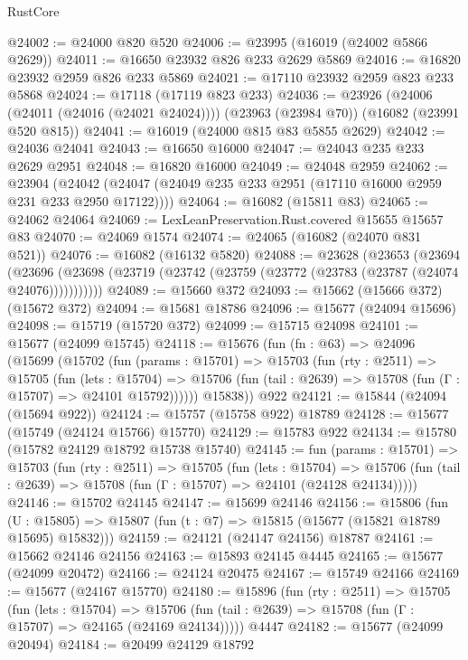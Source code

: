 \begin{lexlean}{RustCore}
\begin{coremodule}
@24002 := @24000 @820 @520
@24006 := @23995 (@16019 (@24002 @5866 @2629))
@24011 := @16650 @23932 @826 @233 @2629 @5869
@24016 := @16820 @23932 @2959 @826 @233 @5869
@24021 := @17110 @23932 @2959 @823 @233 @5868
@24024 := @17118 (@17119 @823 @233)
@24036 := @23926
    (@24006 (@24011 (@24016 (@24021 @24024))))
    (@23963 (@23984 @70))
    (@16082 (@23991 @520 @815))
@24041 := @16019 (@24000 @815 @83 @5855 @2629)
@24042 := @24036 @24041
@24043 := @16650 @16000
@24047 := @24043 @235 @233 @2629 @2951
@24048 := @16820 @16000
@24049 := @24048 @2959
@24062 := @23904
    (@24042 (@24047 (@24049 @235 @233 @2951 (@17110 @16000 @2959 @231 @233 @2950 @17122))))
@24064 := @16082 (@15811 @83)
@24065 := @24062 @24064
@24069 := LexLeanPreservation.Rust.covered @15655 @15657 @83
@24070 := @24069 @1574
@24074 := @24065 (@16082 (@24070 @831 @521))
@24076 := @16082 (@16132 @5820)
@24088 := @23628
    (@23653
      (@23694
        (@23696 (@23698 (@23719 (@23742 (@23759 (@23772 (@23783 (@23787 (@24074 @24076)))))))))))
@24089 := @15660 @372
@24093 := @15662 (@15666 @372) (@15672 @372)
@24094 := @15681 @18786
@24096 := @15677 (@24094 @15696)
@24098 := @15719 (@15720 @372)
@24099 := @15715 @24098
@24101 := @15677 (@24099 @15745)
@24118 := @15676
    (fun (fn : @63) =>
    @24096
      (@15699
        (@15702
          (fun (params : @15701) =>
          @15703
            (fun (rty : @2511) =>
            @15705
              (fun (lets : @15704) =>
              @15706 (fun (tail : @2639) => @15708 (fun (Γ : @15707) => @24101 @15792))))))
        @15838))
    @922
@24121 := @15844 (@24094 (@15694 @922))
@24124 := @15757 (@15758 @922) @18789
@24128 := @15677 (@15749 (@24124 @15766) @15770)
@24129 := @15783 @922
@24134 := @15780 (@15782 @24129 @18792 @15738 @15740)
@24145 := fun (params : @15701) =>
  @15703
    (fun (rty : @2511) =>
    @15705
      (fun (lets : @15704) =>
      @15706 (fun (tail : @2639) => @15708 (fun (Γ : @15707) => @24101 (@24128 @24134)))))
@24146 := @15702 @24145
@24147 := @15699 @24146
@24156 := @15806
    (fun (U : @15805) => @15807 (fun (t : @7) => @15815 (@15677 (@15821 @18789 @15695) @15832)))
@24159 := @24121 (@24147 @24156) @18787
@24161 := @15662 @24146 @24156
@24163 := @15893 @24145 @4445
@24165 := @15677 (@24099 @20472)
@24166 := @24124 @20475
@24167 := @15749 @24166
@24169 := @15677 (@24167 @15770)
@24180 := @15896
    (fun (rty : @2511) =>
    @15705
      (fun (lets : @15704) =>
      @15706 (fun (tail : @2639) => @15708 (fun (Γ : @15707) => @24165 (@24169 @24134)))))
    @4447
@24182 := @15677 (@24099 @20494)
@24184 := @20499 @24129 @18792

\end{coremodule}
\end{lexlean}
